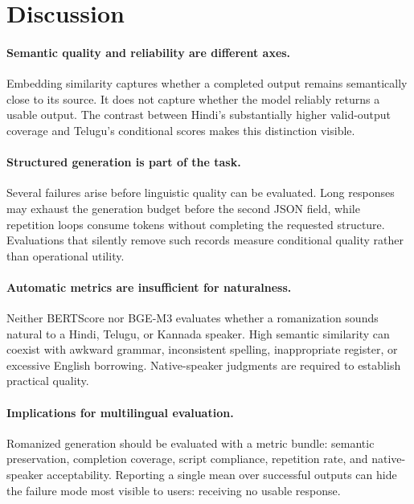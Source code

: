 \section{Discussion}

\paragraph{Semantic quality and reliability are different axes.}
Embedding similarity captures whether a completed output remains semantically
close to its source. It does not capture whether the model reliably returns a
usable output. The contrast between Hindi's substantially higher valid-output
coverage and Telugu's conditional scores makes this distinction visible.

\paragraph{Structured generation is part of the task.}
Several failures arise before linguistic quality can be evaluated. Long
responses may exhaust the generation budget before the second JSON field,
while repetition loops consume tokens without completing the requested
structure. Evaluations that silently remove such records measure conditional
quality rather than operational utility.

\paragraph{Automatic metrics are insufficient for naturalness.}
Neither BERTScore nor BGE-M3 evaluates whether a romanization sounds natural to
a Hindi, Telugu, or Kannada speaker. High semantic similarity can coexist with
awkward grammar, inconsistent spelling, inappropriate register, or excessive
English borrowing. Native-speaker judgments are required to establish
practical quality.

\paragraph{Implications for multilingual evaluation.}
Romanized generation should be evaluated with a metric bundle: semantic
preservation, completion coverage, script compliance, repetition rate, and
native-speaker acceptability. Reporting a single mean over successful outputs
can hide the failure mode most visible to users: receiving no usable response.
